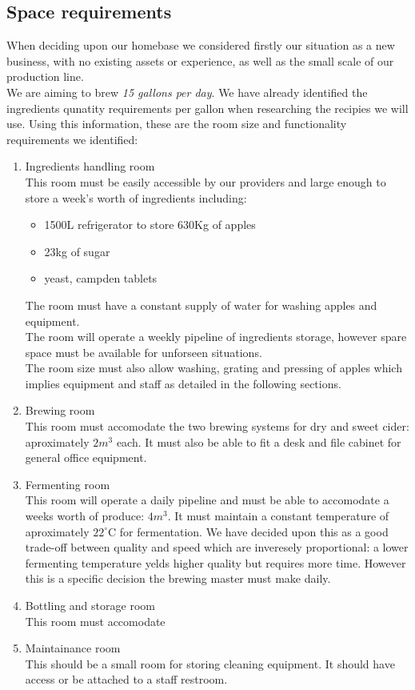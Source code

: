 \documentclass{article}
\begin{document}
	\subsection{Space requirements}
When deciding upon our homebase we considered firstly our situation as a new business, with no existing assets or experience, as well as the small scale of our production line. \\

We are aiming to brew \emph{15 gallons per day}. We have already identified the ingredients qunatity requirements per gallon when researching the recipies we will use. Using this information, these are the room size and functionality requirements we identified: \\

  \begin{enumerate}
  \item Ingredients handling room \\
  This room must be easily accessible by our providers and large enough to store a week's worth of ingredients including: \\
    \begin{itemize}
    \item 1500L refrigerator to store 630Kg of apples
    \item 23kg of sugar
    \item yeast, campden tablets
    \end{itemize}
  The room must have a constant supply of water for washing apples and equipment. \\
  The room will operate a weekly pipeline of ingredients storage, however spare space must be available for unforseen situations.\\
  The room size must also allow washing, grating and pressing of apples which implies equipment and staff as detailed in the following sections.

  \item Brewing room \\
  This room must accomodate the two brewing systems for dry and sweet cider: aproximately $2m^3$ each. It must also be able to fit a desk and file cabinet for general office equipment.
  \item Fermenting room \\
  This room will operate a daily pipeline and must be able to accomodate a weeks worth of produce: $4m^3$. It must maintain a constant temperature of aproximately $22^\circ$C for fermentation. We have decided upon this as a good trade-off between quality and speed which are inveresely proportional: a lower fermenting temperature yelds higher quality but requires more time. However this is a specific decision the brewing master must make daily.

  \item Bottling and storage room \\
  This room must accomodate

  \item Maintainance room\\
  This should be a small room for storing cleaning equipment. It should have access or be attached to a staff restroom.
  \end{enumerate}
\end{document}
